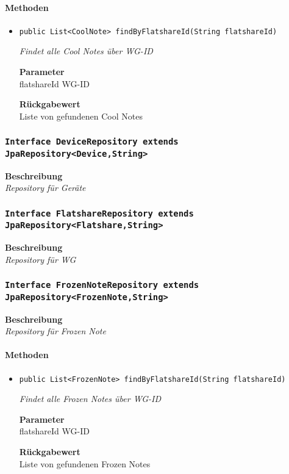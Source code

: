     \paragraph*{Methoden}
    \begin{itemize}
    	\item{\texttt{public List<CoolNote> findByFlatshareId(String flatshareId)}}
    	
    	\textit{Findet alle Cool Notes über WG-ID}
    	
    	\textbf{Parameter} \\
    	flatshareId WG-ID
    	
    	\textbf{Rückgabewert} \\
    	Liste von gefundenen Cool Notes
    \end{itemize}
    \subsubsection{\texttt{Interface DeviceRepository extends JpaRepository<Device,String>}}
    \textbf{Beschreibung} \\
    \textit{Repository für Geräte}
    \subsubsection{\texttt{Interface FlatshareRepository extends JpaRepository<Flatshare,String>}}
    \textbf{Beschreibung} \\
    \textit{Repository für WG}
    \subsubsection{\texttt{Interface FrozenNoteRepository extends JpaRepository<FrozenNote,String>}}
    \textbf{Beschreibung} \\
    \textit{Repository für Frozen Note}
    \paragraph*{Methoden}
    \begin{itemize}
    	\item{\texttt{public List<FrozenNote> findByFlatshareId(String flatshareId)}}
    	
    	\textit{Findet alle Frozen Notes über WG-ID}
    	
    	\textbf{Parameter} \\
    	flatshareId WG-ID
    	
    	\textbf{Rückgabewert} \\
    	Liste von gefundenen Frozen Notes
    \end{itemize}
